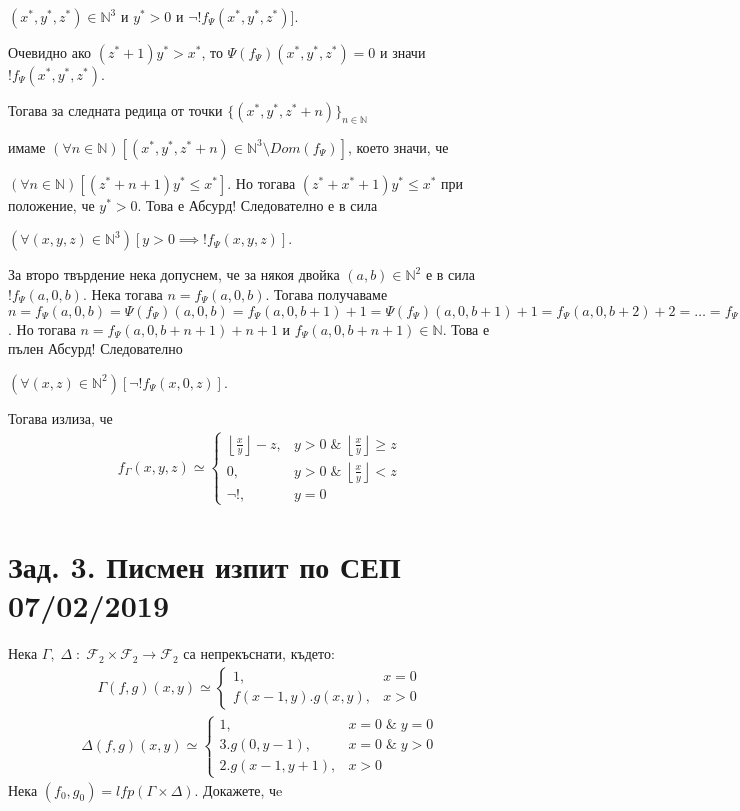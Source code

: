 \documentclass{article}
\begin{document}
\((x^*, y^*, z^*) \in \mathbb{N}^3\) и \(y^* > 0\) и \(\lnot !f_\Psi(x^*, y^*, z^*)]\).

Очевидно ако \((z^* + 1)y^* > x^*\), то \(\Psi(f_\Psi)(x^*, y^*, z^*) = 0\) и значи \(!f_\Psi(x^*, y^*, z^*)\).

Тогава за следната редица от точки \(\{(x^*, y^*, z^* + n)\}_{n \in \mathbb{N}}\)

имаме \((\forall n \in \mathbb{N})[(x^*, y^*, z^* + n) \in \mathbb{N}^3 \setminus Dom(f_\Psi)]\),
което значи, че

\((\forall n \in \mathbb{N})[(z^* + n + 1)y^* \leq x^*]\).
Но тогава \((z^* + x^* + 1)y^* \leq x^*\) при положение, че \(y^* > 0\).
Това е Абсурд! Следователно е в сила

\((\forall (x, y, z) \in \mathbb{N}^3)[y > 0 \implies !f_\Psi(x, y, z)]\).

За второ твърдение нека допуснем,
че за някоя двойка \((a, b) \in \mathbb{N}^2\) е в сила
\(!f_\Psi(a, 0, b)\).
Нека тогава \(n = f_\Psi(a, 0, b)\).
Тогава получаваме \(n = f_\Psi(a, 0, b) = \Psi(f_\Psi)(a, 0, b) = f_\Psi(a, 0, b + 1) + 1 = \Psi(f_\Psi)(a, 0, b + 1) + 1 = f_\Psi(a, 0, b + 2) + 2 = \dots = f_\Psi(a, 0, b + n + 1) + n + 1\).
Но тогава \(n = f_\Psi(a, 0, b + n + 1) + n + 1\) и \(f_\Psi(a, 0, b + n + 1) \in \mathbb{N}\).
Това е пълен Абсурд! Следователно

\((\forall (x, z) \in \mathbb{N}^2)[\lnot!f_\Psi(x, 0, z)]\).

Тогава излиза, че
\begin{align*}
f_\Gamma(x, y, z) \simeq \begin{cases}
    \displaystyle\left\lfloor\frac{x}{y}\right\rfloor - z, & y > 0 \; \& \; \displaystyle\left\lfloor\frac{x}{y}\right\rfloor \geq z \\
    0, & y > 0 \; \& \; \displaystyle\left\lfloor\frac{x}{y}\right\rfloor < z \\
    \lnot!, & y = 0
\end{cases}
\end{align*}
\section*{Зад. 3. Писмен изпит по СЕП 07/02/2019}
Нека \(\Gamma, \; \Delta \; : \; \mathcal{F}_2 \times \mathcal{F}_2 \to \mathcal{F}_2\) са непрекъснати, където:
\begin{align*}
\Gamma(f, g)(x, y) \simeq \begin{cases}
    1, & x = 0 \\
    f(x - 1, y).g(x, y), & x > 0
\end{cases}    
\end{align*}
\begin{align*}
\Delta(f, g)(x, y) \simeq \begin{cases}
    1, & x = 0 \; \& \; y = 0 \\
    3.g(0, y - 1), & x = 0 \; \& \; y > 0 \\
    2.g(x - 1, y + 1), & x > 0
\end{cases}    
\end{align*}
Нека \((f_0, g_0) = lfp(\Gamma \times \Delta)\). Докажете, чe
\end{document}

